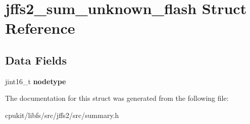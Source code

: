 \hypertarget{structjffs2__sum__unknown__flash}{}\section{jffs2\+\_\+sum\+\_\+unknown\+\_\+flash Struct Reference}
\label{structjffs2__sum__unknown__flash}
\subsection*{Data Fields}
\begin{DoxyCompactItemize}
\item 
\mbox{\label{structjffs2__sum__unknown__flash_a4999f76a4606beeb683d19fb1075fd15}} 
jint16\+\_\+t {\bfseries nodetype}
\end{DoxyCompactItemize}


The documentation for this struct was generated from the following file\+:\begin{DoxyCompactItemize}
\item 
cpukit/libfs/src/jffs2/src/summary.\+h\end{DoxyCompactItemize}
